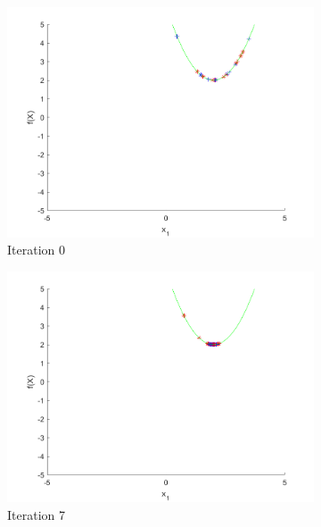 \begin{figure}
  \centering
 \begin{subfigure}[b]{0.4\textwidth}
   \includegraphics[width=\textwidth]{img/smpl/circshft/loa-iter-0}
   \caption{Iteration 0}
   \label{fig:s8-iter-0}
 \end{subfigure}
 \begin{subfigure}[b]{0.4\textwidth}
   \includegraphics[width=\textwidth]{img/smpl/circshft/loa-iter-7}
   \caption{Iteration 7}
   \label{fig:s8-iter-1}
 \end{subfigure}
 \begin{subfigure}[b]{0.4\textwidth}

\end{subfigure}
\end{figure}
